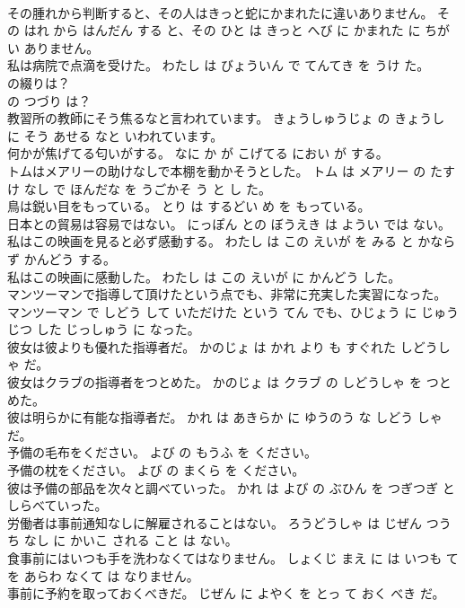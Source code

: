 \documentclass[8pt]{extreport}
\begin{document}
\begin{CJK}{UTF8}{min}
\\	その腫れから判断すると、その人はきっと蛇にかまれたに違いありません。	その はれ から はんだん する と、その ひと は きっと へび に かまれた に ちがい ありません。	
\\	私は病院で点滴を受けた。	わたし は びょういん で てんてき を うけ た。	
\\	の綴りは？	
\\	の つづり は？	
\\	教習所の教師にそう焦るなと言われています。	きょうしゅうじょ の きょうし に そう あせる なと いわれています。	
\\	何かが焦げてる匂いがする。	なに か が こげてる におい が する。	
\\	トムはメアリーの助けなしで本棚を動かそうとした。	トム は メアリー の たすけ なし で ほんだな を うごかそ う と し た。	
\\	鳥は鋭い目をもっている。	とり は するどい め を もっている。	
\\	日本との貿易は容易ではない。	にっぽん との ぼうえき は ようい では ない。	
\\	私はこの映画を見ると必ず感動する。	わたし は この えいが を みる と かならず かんどう する。	
\\	私はこの映画に感動した。	わたし は この えいが に かんどう した。	
\\	マンツーマンで指導して頂けたという点でも、非常に充実した実習になった。	マンツーマン で しどう して いただけた という てん でも、ひじょう に じゅうじつ した じっしゅう に なった。	
\\	彼女は彼よりも優れた指導者だ。	かのじょ は かれ より も すぐれた しどうしゃ だ。	
\\	彼女はクラブの指導者をつとめた。	かのじょ は クラブ の しどうしゃ を つとめた。	
\\	彼は明らかに有能な指導者だ。	かれ は あきらか に ゆうのう な しどう しゃ だ。	
\\	予備の毛布をください。	よび の もうふ を ください。	
\\	予備の枕をください。	よび の まくら を ください。	
\\	彼は予備の部品を次々と調べていった。	かれ は よび の ぶひん を つぎつぎ と しらべていった。	
\\	労働者は事前通知なしに解雇されることはない。	ろうどうしゃ は じぜん つうち なし に かいこ される こと は ない。	
\\	食事前にはいつも手を洗わなくてはなりません。	しょくじ まえ に は いつも て を あらわ なくて は なりません。	
\\	事前に予約を取っておくべきだ。	じぜん に よやく を とっ て おく べき だ。	

\end{CJK}
\end{document}
